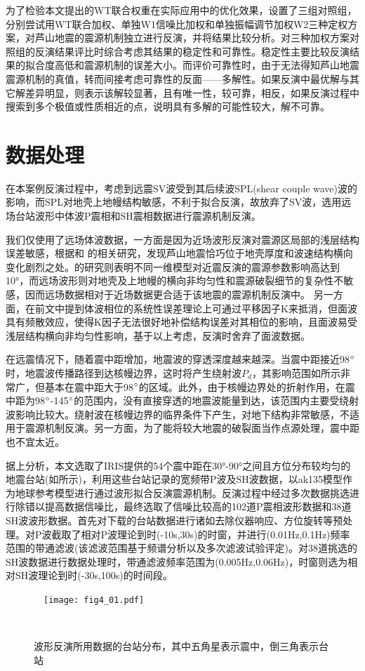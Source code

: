 为了检验本文提出的WT联合权重在实际应用中的优化效果，设置了三组对照组，分别尝试用WT联合加权、单独W1信噪比加权和单独振幅调节加权W2三种定权方案，对芦山地震的震源机制独立进行反演，并将结果比较分析。对三种加权方案对照组的反演结果评比时综合考虑其结果的稳定性和可靠性。稳定性主要比较反演结果的拟合度高低和震源机制的误差大小。而评价可靠性时，由于无法得知芦山地震震源机制的真值，转而间接考虑可靠性的反面——多解性。如果反演中最优解与其它解差异明显，则表示该解较显著，且有唯一性，较可靠，相反，如果反演过程中搜索到多个极值或性质相近的点，说明具有多解的可能性较大，解不可靠。

\section{数据处理}

在本案例反演过程中，考虑到远震SV波受到其后续波SPL(shear couple wave)波的影响，而SPL对地壳上地幔结构敏感，不利于拟合反演，故放弃了SV波，选用远场台站波形中体波P震相和SH震相数据进行震源机制反演。

我们仅使用了远场体波数据，一方面是因为近场波形反演对震源区局部的浅层结构误差敏感，根据和 的相关研究，发现芦山地震恰巧位于地壳厚度和波速结构横向变化剧烈之处。的研究则表明不同一维模型对近震反演的震源参数影响高达到10°，而远场波形则对地壳及上地幔的横向非均匀性和震源破裂细节的复杂性不敏感，因而远场数据相对于近场数据更合适于该地震的震源机制反演中。 
另一方面，在前文中提到体波相位的系统性误差理论上可通过平移因子K来抵消，但面波具有频散效应，使得K因子无法很好地补偿结构误差对其相位的影响，且面波易受浅层结构横向非均匀性影响，基于以上考虑，反演时舍弃了面波数据。

在远震情况下，随着震中距增加，地震波的穿透深度越来越深。当震中距接近98$^\circ$时，地震波传播路径到达核幔边界，这时将产生绕射波$P_d$，其影响范围如所示非常广\citep{Stein2003}，但基本在震中距大于98$^\circ$的区域。此外，由于核幔边界处的折射作用，在震中距为98$^\circ$-145$^\circ$的范围内，没有直接穿透的地震波能量到达，该范围内主要受绕射波影响比较大。绕射波在核幔边界的临界条件下产生，对地下结构非常敏感，不适用于震源机制反演。另一方面，为了能将较大地震的破裂面当作点源处理，震中距也不宜太近。

据上分析，本文选取了IRIS提供的54个震中距在30°-90°之间且方位分布较均匀的地震台站(如所示)，利用这些台站记录的宽频带P波及SH波数据，以ak135模型\citep{Kennett1995}作为地球参考模型进行通过波形拟合反演震源机制。反演过程中经过多次数据挑选进行除错以提高数据信噪比，最终选取了信噪比较高的102道P震相波形数据和38道SH波波形数据。首先对下载的台站数据进行诸如去除仪器响应、方位旋转等预处理。对P波截取了相对P波理论到时(-10s,30s)的时窗，并进行(0.01Hz,0.1Hz)频率范围的带通滤波(该滤波范围基于频谱分析以及多次滤波试验评定)。对38道挑选的SH波数据进行数据处理时，带通滤波频率范围为(0.005Hz,0.06Hz)，时窗则选为相对SH波理论到时(-30s,100s)的时间段。
\begin{figure}
\centering
  \texttt{[image: fig4\_01.pdf]}
  \caption{波形反演所用数据的台站分布，其中五角星表示震中，倒三角表示台站}
  \label{fig4_01}
\end{figure}

